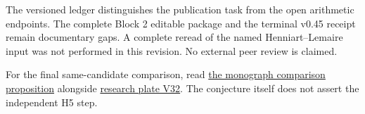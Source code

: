 The versioned ledger distinguishes the publication task from the open arithmetic endpoints. The complete Block 2 editable package and the terminal v0.45 receipt remain documentary gaps. A complete reread of the named Henniart--Lemaire input was not performed in this revision. No external peer review is claimed.

For the final same-candidate comparison, read \href{https://komorebi.invalid/b07/visual_comparison}{the monograph comparison proposition} alongside \href{https://komorebi.invalid/b07/visual_v32}{research plate V32}. The conjecture itself does not assert the independent H5 step.
